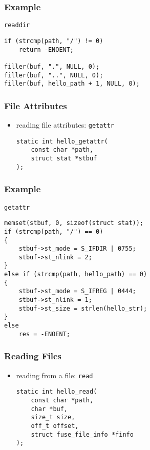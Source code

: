 \documentclass[dvipsnames]{beamer}
\begin{document}
\begin{frame}[fragile]
  \frametitle{Example}

  \begin{exampleblock}{\lstinline|readdir|}
    \begin{lstlisting}
if (strcmp(path, "/") != 0)
    return -ENOENT;

filler(buf, ".", NULL, 0);
filler(buf, "..", NULL, 0);
filler(buf, hello_path + 1, NULL, 0);
    \end{lstlisting}
  \end{exampleblock}
\end{frame}

\begin{frame}[fragile]
  \frametitle{File Attributes}

  \begin{itemize}
    \item reading file attributes: \lstinline|getattr|
    \begin{lstlisting}[style=syntax]
static int hello_getattr(
    const char *path,
    struct stat *stbuf
);
    \end{lstlisting}
  \end{itemize}
\end{frame}

\begin{frame}[fragile]
  \frametitle{Example}

  \begin{exampleblock}{\lstinline|getattr|}
    \begin{lstlisting}
memset(stbuf, 0, sizeof(struct stat));
if (strcmp(path, "/") == 0)
{
    stbuf->st_mode = S_IFDIR | 0755;
    stbuf->st_nlink = 2;
}
else if (strcmp(path, hello_path) == 0)
{
    stbuf->st_mode = S_IFREG | 0444;
    stbuf->st_nlink = 1;
    stbuf->st_size = strlen(hello_str);
}
else
    res = -ENOENT;
    \end{lstlisting}
  \end{exampleblock}
\end{frame}

\begin{frame}[fragile]
  \frametitle{Reading Files}

  \begin{itemize}
    \item reading from a file: \lstinline|read|
    \begin{lstlisting}[style=syntax]
static int hello_read(
    const char *path,
    char *buf,
    size_t size,
    off_t offset,
    struct fuse_file_info *finfo
);
    \end{lstlisting}
  \end{itemize}
\end{frame}
\end{document}
